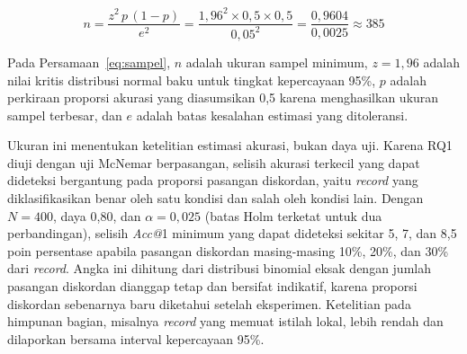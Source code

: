 \begin{equation}
  n = \frac{z^2 \, p \, (1-p)}{e^2} = \frac{1{,}96^2 \times 0{,}5 \times 0{,}5}{0{,}05^2} = \frac{0{,}9604}{0{,}0025} \approx 385
  \label{eq:sampel}
\end{equation}

\noindent Pada Persamaan~\eqref{eq:sampel}, $n$ adalah ukuran sampel minimum, $z = 1{,}96$ adalah nilai kritis distribusi normal baku untuk tingkat kepercayaan 95\%, $p$ adalah perkiraan proporsi akurasi yang diasumsikan 0,5 karena menghasilkan ukuran sampel terbesar, dan $e$ adalah batas kesalahan estimasi yang ditoleransi.

Ukuran ini menentukan ketelitian estimasi akurasi, bukan daya uji. Karena RQ1 diuji dengan uji McNemar berpasangan, selisih akurasi terkecil yang dapat dideteksi bergantung pada proporsi pasangan diskordan, yaitu \textit{record} yang diklasifikasikan benar oleh satu kondisi dan salah oleh kondisi lain. Dengan $N = 400$, daya 0,80, dan $\alpha = 0{,}025$ (batas Holm terketat untuk dua perbandingan), selisih \textit{Acc@}1 minimum yang dapat dideteksi sekitar 5, 7, dan 8,5 poin persentase apabila pasangan diskordan masing-masing 10\%, 20\%, dan 30\% dari \textit{record}. Angka ini dihitung dari distribusi binomial eksak dengan jumlah pasangan diskordan dianggap tetap dan bersifat indikatif, karena proporsi diskordan sebenarnya baru diketahui setelah eksperimen. Ketelitian pada himpunan bagian, misalnya \textit{record} yang memuat istilah lokal, lebih rendah dan dilaporkan bersama interval kepercayaan 95\%.

